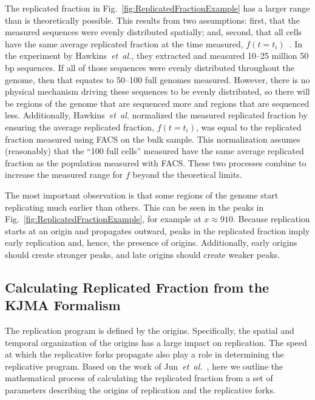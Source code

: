 		The replicated fraction in Fig.~\ref{fig:ReplicatedFractionExample} has a larger range than is theoretically possible.
		This results from two assumptions: first, that the measured sequences were evenly distributed spatially; and, second, that all cells have the same average replicated fraction at the time measured, $f(t=t_i)$~\cite{StochasticTermination}.
		In the experiment by Hawkins~\emph{et~al.}, they extracted and measured 10--25 million 50 bp sequences.
		If all of those sequences were evenly distributed throughout the genome, then that equates to 50--100 full genomes measured.
		However, there is no physical mechanism driving these sequences to be evenly distributed, so there will be regions of the genome that are sequenced more and regions that are sequenced less.
		Additionally, Hawkins~\emph{et~al.} normalized the measured replicated fraction by ensuring the average replicated fraction, $f(t=t_i)$, was equal to the replicated fraction measured using FACS on the bulk sample.
		This normalization assumes (reasonably) that the ``100 full cells'' measured have the same average replicated fraction as the population measured with FACS.
		These two processes combine to increase the measured range for $f$ beyond the theoretical limits.
		
		The most important observation is that some regions of the genome start replicating much earlier than others.
		This can be seen in the peaks in Fig.~\ref{fig:ReplicatedFractionExample}, for example at $x \approx 910$.
		Because replication starts at an origin and propagates outward, peaks in the replicated fraction imply early replication and, hence, the presence of origins.
		Additionally, early origins should create stronger peaks, and late origins should create weaker peaks.
		
		
		\subsection{Calculating Replicated Fraction from the KJMA Formalism}
		\label{subsec:KJMA}
		
		The replication program is defined by the origins.
		Specifically, the spatial and temporal organization of the origins has a large impact on replication.
		The speed at which the replicative forks propagate also play a role in determining the replicative program.
		Based on the work of Jun~\emph{et~al.}~\cite{KJMA1}, here we outline the mathematical process of calculating the replicated fraction from a set of parameters describing the origins of replication and the replicative forks.
		
